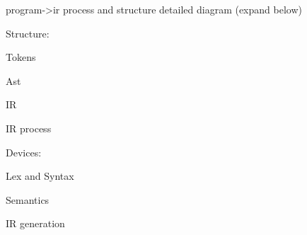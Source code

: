 program->ir process and structure detailed diagram (expand below)

Structure:

    Tokens

    Ast

    IR

IR process

Devices:

    Lex and Syntax

    Semantics

    IR generation